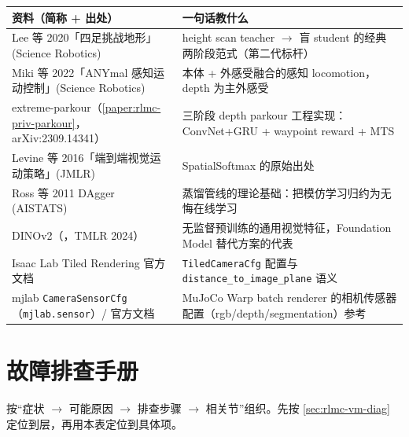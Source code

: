 \begin{center}
\small
\begin{tabular}{@{}p{5.6cm}p{5.8cm}@{}}
\toprule
资料（简称 + 出处） & 一句话教什么 \\
\midrule
Lee 等 2020「四足挑战地形」(Science Robotics)\,\cite{lee2020quadruped} & height scan teacher $\to$ 盲 student 的经典两阶段范式（第二代标杆） \\
Miki 等 2022「ANYmal 感知运动控制」(Science Robotics)\,\cite{miki2022perceptive} & 本体 + 外感受融合的感知 locomotion，depth 为主外感受 \\
extreme-parkour（\cref{paper:rlmc-priv-parkour}，arXiv:2309.14341） & 三阶段 depth parkour 工程实现：ConvNet+GRU + waypoint reward + MTS \\
Levine 等 2016「端到端视觉运动策略」(JMLR)\,\cite{levine2016visuomotor} & SpatialSoftmax 的原始出处 \\
Ross 等 2011 DAgger (AISTATS)\,\cite{ross2011dagger} & 蒸馏管线的理论基础：把模仿学习归约为无悔在线学习 \\
DINOv2（\cite{oquab2024dinov2}，TMLR 2024） & 无监督预训练的通用视觉特征，Foundation Model 替代方案的代表 \\
Isaac Lab Tiled Rendering 官方文档 & \texttt{TiledCameraCfg} 配置与 \texttt{distance\_to\_image\_plane} 语义 \\
mjlab \texttt{CameraSensorCfg}（\texttt{mjlab.sensor}）/ 官方文档 & MuJoCo Warp batch renderer 的相机传感器配置（rgb/depth/segmentation）参考 \\
\bottomrule
\end{tabular}
\end{center}

\section{故障排查手册}
\label{sec:rlmc-vm-trouble}

按“症状 $\to$ 可能原因 $\to$ 排查步骤 $\to$ 相关节”组织。先按 \cref{sec:rlmc-vm-diag} 定位到层，再用本表定位到具体项。

